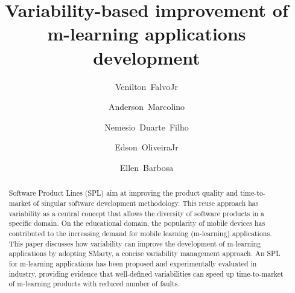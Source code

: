 \documentclass[preprint,12pt]{elsarticle}
\begin{document}
\begin{frontmatter}



\title{Variability-based improvement of m-learning applications development}


\author[usp]{Venilton~FalvoJr}
\author[usp]{Anderson~Marcolino}
\author[usp]{Nemesio~Duarte~Filho}
\author[uem]{Edson~OliveiraJr}
\author[usp]{Ellen~Barbosa}


\address[usp]{University of Sao Paulo (USP), Brazil}
\address[uem]{State University of Maringa (UEM), Brazil}

\begin{abstract}
Software Product Lines (SPL) aim at improving the product quality and time-to-market of singular software development methodology. This reuse approach has variability as a central concept that allows the diversity of software products in a specific domain. On the educational domain, the popularity of mobile devices has contributed to the increasing demand for mobile learning (m-learning) applications. This paper discusses how variability can improve the development of m-learning applications by adopting SMarty, a concise variability management approach. An SPL for m-learning applications has been proposed and experimentally evaluated in industry, providing evidence that well-defined variabilities can speed up time-to-market of m-learning products with reduced number of faults.
\end{abstract}


\end{frontmatter}
\end{document}
